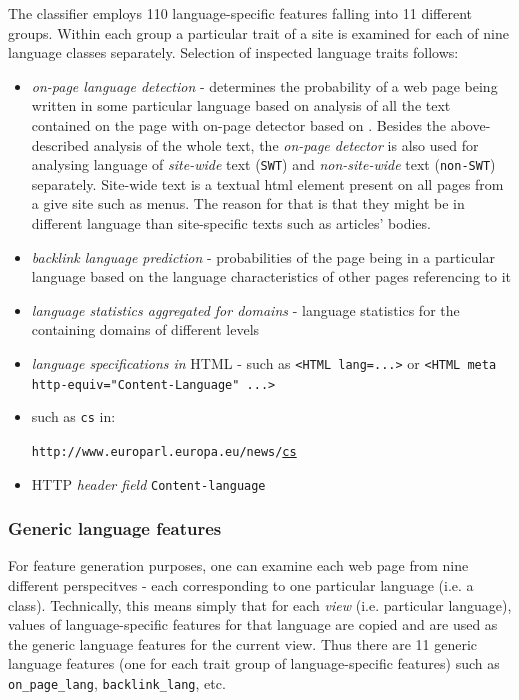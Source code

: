 \documentclass{acm_proc_article-sp}
\begin{document}
{  The classifier employs 110 language-specific features falling into 11 different  groups. Within each group a
  particular trait of a site is examined for each of nine language classes separately. Selection of
  inspected language traits follows: 
  \begin{itemize}
    \item \textit{on-page language detection} - 
      determines the probability of a web page being written in some particular
      language based on analysis of all the text
      contained on the page with on-page detector based on \cite{Rehurek:languageidentification} . 
      Besides the above-described analysis of the whole text, the \textit{on-page 
      detector} is also used for analysing language of \textit{site-wide} text (\texttt{SWT}) and
    \textit{non-site-wide} text (\texttt{non-SWT}) separately. Site-wide text is a textual html element 
    present on all pages from a give site such as menus. The reason for that is that they might be 
    in different language than site-specific texts such as articles' bodies.
    \item \textit{backlink language prediction} - probabilities of the page being in a particular
      language based on the language characteristics of other pages referencing to it 
    \item \textit{language statistics aggregated for domains} - language statistics for the
      containing domains of different levels
    \item \textit{language specifications in} HTML - such as \texttt{<HTML lang=...>} or \texttt{<HTML
      meta http-equiv="Content-Language"  ...>}
    \item {} such as \texttt{cs} in:

    \texttt{http://www.europarl.europa.eu/news/}\underline{\texttt{cs}} 
    \item HTTP \textit{header field} \texttt{Content-language}
  \end{itemize}


 \subsubsection{Generic language features}
    For feature generation purposes, one can examine each web page from nine different perspecitves -
    each corresponding to one particular language (i.e. a class).
   Technically, this means simply
    that for each \textit{view} (i.e. particular language), values of language-specific
    features for that language are copied and are used as the generic language features for the current view. Thus
    there are 11 generic language features (one for each trait group of language-specific
    features) such as \texttt{on\_page\_lang}, \texttt{backlink\_lang}, etc.
}
\end{document}
